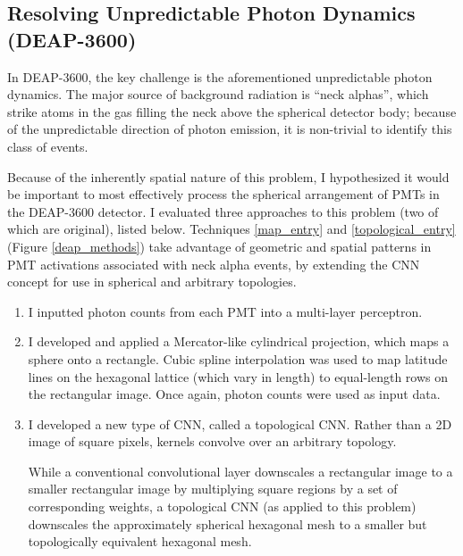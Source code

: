 \documentclass[12pt]{article}
\begin{document}
\subsection{Resolving Unpredictable Photon Dynamics (DEAP-3600)}

In DEAP-3600, the key challenge is the aforementioned unpredictable photon dynamics. The major source of background radiation is ``neck alphas'', which strike atoms in the gas filling the neck above the spherical detector body; because of the unpredictable direction of photon emission, it is non-trivial to identify this class of events.

Because of the inherently spatial nature of this problem, I hypothesized it would be important to most effectively process the spherical arrangement of PMTs in the DEAP-3600 detector. I evaluated three approaches to this problem (two of which are original), listed below. Techniques \ref{map_entry} and \ref{topological_entry} (Figure \ref{deap_methods}) take advantage of geometric and spatial patterns in PMT activations associated with neck alpha events, by extending the CNN concept for use in spherical and arbitrary topologies.

\begin{enumerate}
    \item I inputted photon counts from each PMT into a multi-layer perceptron.

    \item I developed and applied a Mercator-like cylindrical projection, which maps a sphere onto a rectangle. Cubic spline interpolation was used to map latitude lines on the hexagonal lattice (which vary in length) to equal-length rows on the rectangular image. Once again, photon counts were used as input data. \label{map_entry}

    \item I developed a new type of CNN, called a topological CNN. Rather than a 2D image of square pixels, kernels convolve over an arbitrary topology. \label{topological_entry}
    
    While a conventional convolutional layer downscales a rectangular image to a smaller rectangular image by multiplying square regions by a set of corresponding weights, a topological CNN (as applied to this problem) downscales the approximately spherical hexagonal mesh to a smaller but topologically equivalent hexagonal mesh.
\end{enumerate}
\end{document}
